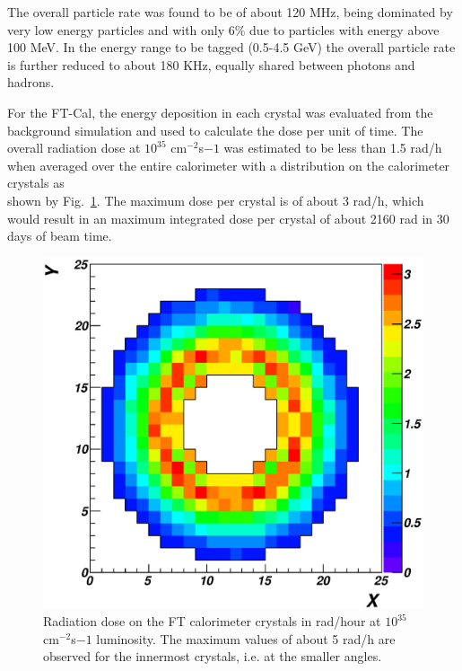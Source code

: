 The overall particle rate was found to be of about 120 MHz, being dominated by very low energy particles and with only 6\% due to particles with energy above 100 MeV. In the energy range to be tagged (0.5-4.5 GeV) the overall particle rate is further reduced to about 180 KHz, equally shared between photons and hadrons. 

For the FT-Cal, the energy deposition in each crystal was evaluated from the background simulation and used to calculate the dose per unit of time. The overall radiation dose at $10^{35}$ cm$^{-2}$s${-1}$ was estimated to be less than 1.5 rad/h when averaged over the entire calorimeter with a distribution on the calorimeter crystals as\\ shown by Fig.~\ref{fig:ft_rad}. The maximum dose per crystal is of about 3 rad/h, which would result in an maximum integrated dose per crystal of about 2160 rad in 30 days of beam time.
\begin{figure}
\includegraphics[height=\columnwidth]{fig/ft_rad.eps}
\caption{Radiation dose on the FT calorimeter crystals in rad/hour at $10^{35}$ cm$^{-2}$s${-1}$ luminosity. The maximum values of about 5 rad/h are observed for the innermost crystals, i.e. at the smaller angles.}
\label{fig:ft_rad}
\end{figure}



